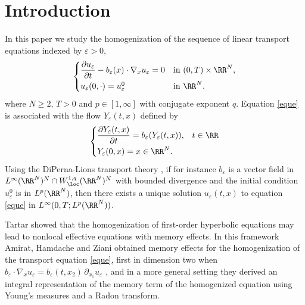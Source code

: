 \section{Introduction}
In this paper we study the homogenization of the sequence of linear transport equations indexed by $\varepsilon>0$,
\begin{equation}\label{eque}
\begin{cases}
\dfrac{\partial u_\varepsilon}{\partial t}-b_\varepsilon(x)\cdot\nabla_x u_\varepsilon=0 & \mbox{in }(0,T)\times\RR^N,
\\[5pt]
u_\varepsilon(0,\cdot)=u_\varepsilon^0 & \mbox{in }\RR^N.
\end{cases}
\end{equation}
where $N\geq 2$, $T>0$ and $p\in[1,\infty]$ with conjugate exponent $q$.
Equation \eqref{eque} is associated with the flow $Y_\varepsilon(t,x)$ defined by
\begin{equation}\label{Yebei}
\begin{cases}
\dfrac{\partial Y_\varepsilon(t,x)}{\partial t}=b_\varepsilon(Y_\varepsilon(t,x)), & t\in\RR
\\[5pt]
Y_\varepsilon(0,x)=x\in\RR^N.
\end{cases}
\end{equation}
Using the DiPerna-Lions transport theory \cite[Cor.\,II.1]{DiLi}, if for instance $b_\varepsilon$ is a vector field in $L^\infty(\RR^N)^N\cap W^{1,q}_\loc(\RR^N)^N$ with bounded divergence and the initial condition~$u_\varepsilon^0$ is in $L^p(\RR^N)$, then there exists a unique solution $u_\varepsilon(t,x)$ to equation \eqref{eque} in $L^\infty(0,T;L^p(\RR^N))$.

Tartar \cite{Tar} showed that the homogenization of first-order hyperbolic equations may lead to nonlocal effective equations with memory effects.
In this framework Amirat, Hamdache and Ziani obtained memory effects for the homogenization of the transport equation \eqref{eque}, first in dimension two when $b_\varepsilon\cdot\nabla_x u_\varepsilon=b_\varepsilon(t,x_2)\,\partial_{x_1}u_\varepsilon$ \cite{AHZ1}, and in a more general setting \cite{AHZ2,AHZ3} they derived an integral representation of the memory term of the homogenized equation using Young's measures and a Radon transform.

